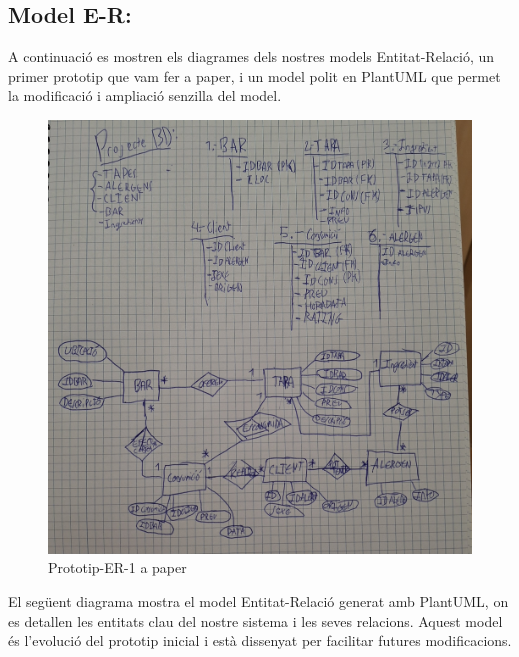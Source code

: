 \documentclass[12pt,a4paper]{article}
\begin{document}
\subsection{Model E-R:}

A continuació es mostren els diagrames dels nostres models Entitat-Relació, un primer prototip que vam fer a paper, i un model polit en PlantUML que permet la modificació i ampliació senzilla del model.

\begin{figure}[ht]
    \centering
    \includegraphics[width=0.5\linewidth]{diddy.jpg}
    \caption{Prototip-ER-1 a paper}
    \label{fig:enter-label}
\end{figure}

El següent diagrama mostra el model Entitat-Relació generat amb PlantUML, on es detallen les entitats clau del nostre sistema i les seves relacions. Aquest model és l'evolució del prototip inicial i està dissenyat per facilitar futures modificacions.
\end{document}
